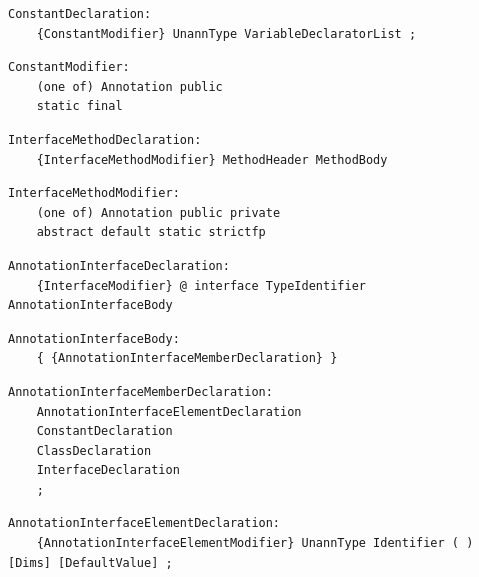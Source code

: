 \noindent\textbf{\texttt{}}\par
\begin{lstlisting}
ConstantDeclaration:
    {ConstantModifier} UnannType VariableDeclaratorList ;
\end{lstlisting}

\noindent\textbf{\texttt{}}\par
\begin{lstlisting}
ConstantModifier:
    (one of) Annotation public
    static final
\end{lstlisting}

\noindent\textbf{\texttt{}}\par
\begin{lstlisting}
InterfaceMethodDeclaration:
    {InterfaceMethodModifier} MethodHeader MethodBody
\end{lstlisting}

\noindent\textbf{\texttt{}}\par
\begin{lstlisting}
InterfaceMethodModifier:
    (one of) Annotation public private
    abstract default static strictfp
\end{lstlisting}

\noindent\textbf{\texttt{}}\par
\begin{lstlisting}
AnnotationInterfaceDeclaration:
    {InterfaceModifier} @ interface TypeIdentifier AnnotationInterfaceBody
\end{lstlisting}

\noindent\textbf{\texttt{}}\par
\begin{lstlisting}
AnnotationInterfaceBody:
    { {AnnotationInterfaceMemberDeclaration} }
\end{lstlisting}

\noindent\textbf{\texttt{}}\par
\begin{lstlisting}
AnnotationInterfaceMemberDeclaration:
    AnnotationInterfaceElementDeclaration
    ConstantDeclaration
    ClassDeclaration
    InterfaceDeclaration
    ;
\end{lstlisting}

\noindent\textbf{\texttt{}}\par
\begin{lstlisting}
AnnotationInterfaceElementDeclaration:
    {AnnotationInterfaceElementModifier} UnannType Identifier ( ) [Dims] [DefaultValue] ;
\end{lstlisting}

